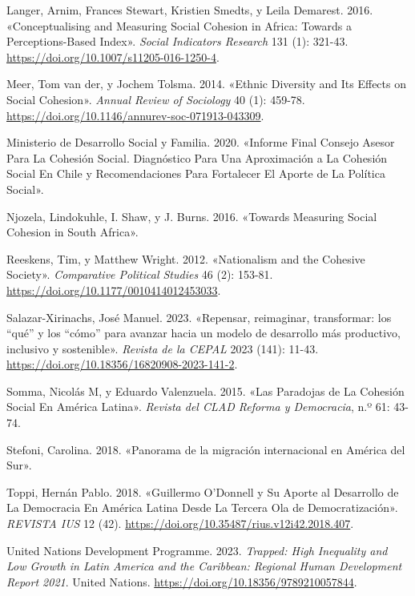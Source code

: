 \documentclass[
  letterpaper,
  DIV=11,
  numbers=noendperiod]{scrartcl}
\newlength{\cslhangindent}
\newenvironment{CSLReferences}[2] %
 {\begin{list}{}{%
  \setlength{\itemindent}{0pt}
  \setlength{\leftmargin}{0pt}
  \setlength{\parsep}{0pt}
  \ifodd #1
   \setlength{\leftmargin}{\cslhangindent}
   \setlength{\itemindent}{-1\cslhangindent}
  \fi
  \setlength{\itemsep}{#2\baselineskip}}}
 {\end{list}}
\begin{document}
\begin{CSLReferences}{1}{0}
Langer, Arnim, Frances Stewart, Kristien Smedts, y Leila Demarest. 2016.
{«Conceptualising and {Measuring Social Cohesion} in {Africa}: {Towards}
a {Perceptions-Based Index}»}. \emph{Social Indicators Research} 131
(1): 321-43. \url{https://doi.org/10.1007/s11205-016-1250-4}.

Meer, Tom van der, y Jochem Tolsma. 2014. {«Ethnic {Diversity} and {Its
Effects} on {Social Cohesion}»}. \emph{Annual Review of Sociology} 40
(1): 459-78. \url{https://doi.org/10.1146/annurev-soc-071913-043309}.

Ministerio de Desarrollo Social y Familia. 2020. {«Informe {Final
Consejo Asesor} Para La {Cohesi{ó}n Social}. {Diagn{ó}stico} Para Una
Aproximaci{ó}n a La Cohesi{ó}n Social En {Chile} y Recomendaciones Para
Fortalecer El Aporte de La Pol{í}tica Social»}.

Njozela, Lindokuhle, I. Shaw, y J. Burns. 2016. {«Towards Measuring
Social Cohesion in {South Africa}»}.

Reeskens, Tim, y Matthew Wright. 2012. {«Nationalism and the {Cohesive
Society}»}. \emph{Comparative Political Studies} 46 (2): 153-81.
\url{https://doi.org/10.1177/0010414012453033}.

Salazar-Xirinachs, José Manuel. 2023. {«{Repensar, reimaginar,
transformar: los {``qu{é}''} y los {``c{ó}mo''} para avanzar hacia un
modelo de desarrollo m{á}s productivo, inclusivo y sostenible}»}.
\emph{Revista de la CEPAL} 2023 (141): 11-43.
\url{https://doi.org/10.18356/16820908-2023-141-2}.

Somma, Nicolás M, y Eduardo Valenzuela. 2015. {«Las {Paradojas} de {La
Cohesi{ó}n Social En Am{é}rica Latina}»}. \emph{Revista del CLAD Reforma
y Democracia}, n.º 61: 43-74.

Stefoni, Carolina. 2018. {«{Panorama de la migraci{ó}n internacional en
Am{é}rica del Sur}»}.

Toppi, Hernán Pablo. 2018. {«Guillermo {O}'{Donnell} y Su Aporte al
Desarrollo de La Democracia En {Am{é}rica Latina} Desde La Tercera Ola
de Democratizaci{ó}n»}. \emph{REVISTA IUS} 12 (42).
\url{https://doi.org/10.35487/rius.v12i42.2018.407}.

United Nations Development Programme. 2023. \emph{Trapped: {High
Inequality} and {Low Growth} in {Latin America} and the {Caribbean}:
{Regional Human Development Report} 2021}. United Nations.
\url{https://doi.org/10.18356/9789210057844}.

\end{CSLReferences}
\end{document}
